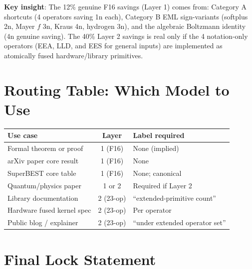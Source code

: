 \documentclass[11pt]{article}
\begin{document}
\textbf{Key insight}: The 12\% genuine F16 savings (Layer 1) comes from:
Category A shortcuts (4 operators saving 1n each), Category B EML sign-variants
(softplus 2n, Mayer $f$ 3n, Kraus 4n, hydrogen 3n), and the algebraic
Boltzmann identity (4n genuine saving).
The 40\% Layer 2 savings is real only if the 4 notation-only operators (EEA, LLD,
and EES for general inputs) are implemented as atomically fused hardware/library primitives.

\section{Routing Table: Which Model to Use}

\begin{center}
\renewcommand{\arraystretch}{1.2}
\begin{tabular}{lcl}
\toprule
Use case & Layer & Label required \\
\midrule
Formal theorem or proof & 1 (F16) & None (implied) \\
arXiv paper core result & 1 (F16) & None \\
SuperBEST core table & 1 (F16) & None; canonical \\
Quantum/physics paper & 1 or 2 & Required if Layer 2 \\
Library documentation & 2 (23-op) & ``extended-primitive count'' \\
Hardware fused kernel spec & 2 (23-op) & Per operator \\
Public blog / explainer & 2 (23-op) & ``under extended operator set'' \\
\bottomrule
\end{tabular}
\end{center}

\section{Final Lock Statement}
\end{document}
